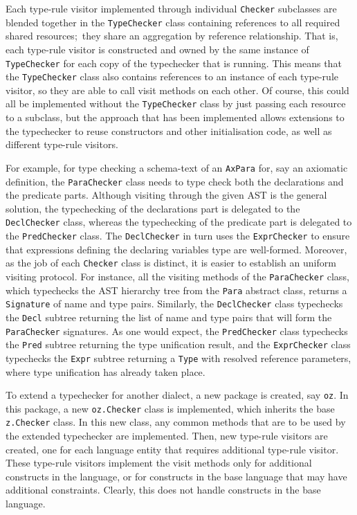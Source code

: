 \documentclass{llncs}
\begin{document}
Each type-rule visitor implemented through individual {\tt Checker} subclasses
are blended together in the {\tt TypeChecker} class containing references to all
required shared resources;~they share an aggregation by reference relationship.
That is, each type-rule visitor is constructed and owned by the same instance of
{\tt TypeChecker} for each copy of the typechecker that is running.
This means that the {\tt TypeChecker} class also contains references to an instance
of each type-rule visitor, so they are able to call visit methods on each other.
Of course, this could all be implemented without the {\tt TypeChecker} class by just
passing each resource to a subclass, but the approach that has been implemented allows
extensions to the typechecker to reuse constructors and other initialisation code,
as well as different type-rule visitors.

For example, for type checking a schema-text of an {\tt AxPara} for, say an
axiomatic definition, the {\tt ParaChecker} class needs to type check both the
declarations and the predicate parts. Although visiting through the given AST is the
general solution, the typechecking of the declarations part is delegated to the {\tt DeclChecker} class,
whereas the typechecking of the predicate part is delegated to the {\tt PredChecker} class.
The {\tt DeclChecker} in turn uses the {\tt ExprChecker} to ensure that expressions defining the
declaring variables type are well-formed.
Moreover, as the job of each {\tt Checker} class is distinct, it is easier to establish an
uniform visiting protocol. For instance, all the visiting methods of the {\tt ParaChecker} class,
which typechecks the AST hierarchy tree from the {\tt Para} abstract class, returns a {\tt Signature}
of name and type pairs. Similarly, the {\tt DeclChecker} class typechecks the {\tt Decl} subtree
returning the list of name and type pairs that will form the {\tt ParaChecker} signatures.
As one would expect, the {\tt PredChecker} class typechecks the {\tt Pred} subtree
returning the type unification result, and the {\tt ExprChecker} class typechecks the {\tt Expr} subtree
returning a {\tt Type} with resolved reference parameters, where type unification has already taken place.

To extend a typechecker for another dialect, a new package is created, say {\tt oz}.
In this package, a new {\tt oz.Checker} class is implemented, which
inherits the base {\tt z.Checker} class. In this new class, any common
methods that are to be used by the extended typechecker are implemented.
Then, new type-rule visitors are created, one for each language entity that
requires additional type-rule visitor.  These type-rule visitors
implement the visit methods only for additional constructs in the
language, or for constructs in the base language that may have
additional constraints. Clearly, this does not handle constructs in
the base language.
\end{document}
